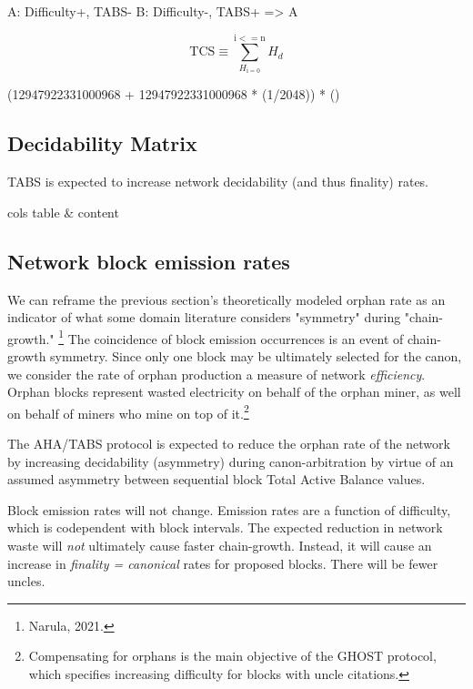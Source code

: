 \documentclass[11pt]{article}
\theoremstyle{plain}
\begin{document}
{{    A: Difficulty+, TABS-
B: Difficulty-, TABS+
    => A


    \begin{equation}
        \mathrm{TCS} \equiv \sum_{H_\mathrm{i = 0}}^{\mathrm{i <= n}} H_d
    \end{equation}


    (12947922331000968 + 12947922331000968 * (1/2048)) * ()

    \subsection{\normalsize{Decidability Matrix}}

    TABS is expected to increase network decidability (and thus finality) rates.

    \begin{tabular}[pos]{cols}
        table & content
    \end{tabular}

}
\subsection{\normalsize{Network block emission rates}}

We can reframe the previous section's theoretically modeled orphan rate
as an indicator of what some domain literature considers "symmetry" during "chain-growth."\nolinebreak
\footnote{Narula, 2021.}
The coincidence of block emission occurrences is an event of chain-growth symmetry.
Since only one block may be ultimately selected for the canon, we consider the rate of orphan production
a measure of network \emph{efficiency}.
Orphan blocks represent wasted electricity on behalf of the orphan miner,
as well on behalf of miners who mine on top of it.\footnote{
    Compensating for orphans is the main objective of the GHOST protocol,
    which specifies increasing difficulty for blocks with uncle citations.
}

The AHA/TABS protocol is expected to reduce the orphan rate of the network by increasing decidability (asymmetry)
during canon-arbitration by virtue of an assumed asymmetry between sequential block Total Active Balance values.

Block emission rates will not change.
Emission rates are a function of difficulty, which is codependent with block intervals.
The expected reduction in network waste will \emph{not} ultimately cause faster chain-growth.
Instead, it will cause an increase in \emph{finality = canonical} rates for proposed blocks.
There will be fewer uncles.

}
\end{document}

